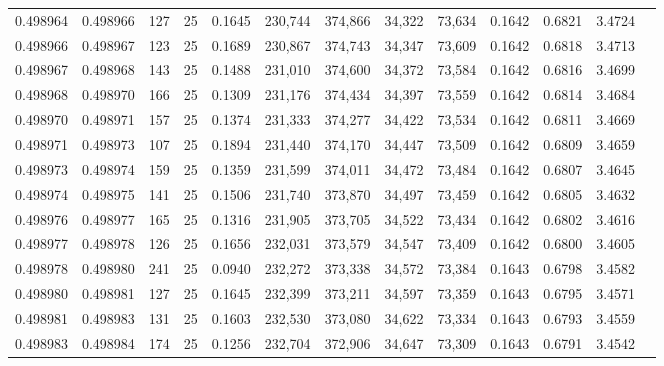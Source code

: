 \begin{tabular}{rrrrrrrrrrrrr}
0.498964 & 0.498966 & 127 &  25 &                                     0.1645 & 230,744 & 374,866 &  34,322 &  73,634 & 0.1642 & 0.6821 & 3.4724 \\
0.498966 & 0.498967 & 123 &  25 &                                     0.1689 & 230,867 & 374,743 &  34,347 &  73,609 & 0.1642 & 0.6818 & 3.4713 \\
0.498967 & 0.498968 & 143 &  25 &                                     0.1488 & 231,010 & 374,600 &  34,372 &  73,584 & 0.1642 & 0.6816 & 3.4699 \\
0.498968 & 0.498970 & 166 &  25 &                                     0.1309 & 231,176 & 374,434 &  34,397 &  73,559 & 0.1642 & 0.6814 & 3.4684 \\
0.498970 & 0.498971 & 157 &  25 &                                     0.1374 & 231,333 & 374,277 &  34,422 &  73,534 & 0.1642 & 0.6811 & 3.4669 \\
0.498971 & 0.498973 & 107 &  25 &                                     0.1894 & 231,440 & 374,170 &  34,447 &  73,509 & 0.1642 & 0.6809 & 3.4659 \\
0.498973 & 0.498974 & 159 &  25 &                                     0.1359 & 231,599 & 374,011 &  34,472 &  73,484 & 0.1642 & 0.6807 & 3.4645 \\
0.498974 & 0.498975 & 141 &  25 &                                     0.1506 & 231,740 & 373,870 &  34,497 &  73,459 & 0.1642 & 0.6805 & 3.4632 \\
0.498976 & 0.498977 & 165 &  25 &                                     0.1316 & 231,905 & 373,705 &  34,522 &  73,434 & 0.1642 & 0.6802 & 3.4616 \\
0.498977 & 0.498978 & 126 &  25 &                                     0.1656 & 232,031 & 373,579 &  34,547 &  73,409 & 0.1642 & 0.6800 & 3.4605 \\
0.498978 & 0.498980 & 241 &  25 &                                     0.0940 & 232,272 & 373,338 &  34,572 &  73,384 & 0.1643 & 0.6798 & 3.4582 \\
0.498980 & 0.498981 & 127 &  25 &                                     0.1645 & 232,399 & 373,211 &  34,597 &  73,359 & 0.1643 & 0.6795 & 3.4571 \\
0.498981 & 0.498983 & 131 &  25 &                                     0.1603 & 232,530 & 373,080 &  34,622 &  73,334 & 0.1643 & 0.6793 & 3.4559 \\
0.498983 & 0.498984 & 174 &  25 &                                     0.1256 & 232,704 & 372,906 &  34,647 &  73,309 & 0.1643 & 0.6791 & 3.4542 \\

\end{tabular}
